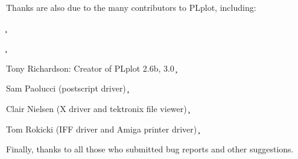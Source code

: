 Thanks are also due to the many contributors to PLplot, including:

\c \begin{description}
\c \item Tony Richardson: Creator of PLplot 2.6b, 3.0
\c \item Sam Paolucci (postscript driver)
\c \item Clair Nielsen (X driver and tektronix file viewer)
\c \item Tom Rokicki (IFF driver and Amiga printer driver)
\c \end{description}

Finally, thanks to all those who submitted bug reports and other
suggestions.


